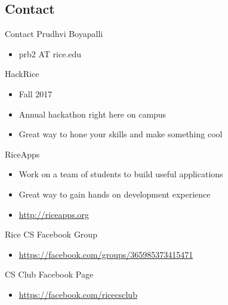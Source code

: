 \documentclass{beamer}
\begin{document}
\subsection{Contact}
	\begin{frame}[t]{Contact}
		Prudhvi Boyapalli
		\begin{itemize}
			\item{prb2 AT rice.edu}
		\end{itemize}
		\pause

		HackRice
		\begin{itemize}
			\item{Fall 2017}
			\item{Annual hackathon right here on campus}
			\item{Great way to hone your skills and make something cool}
		\end{itemize}
		\pause

		RiceApps
		\begin{itemize}
			\item{Work on a team of students to build useful applications}
			\item{Great way to gain hands on development experience}
			\item{\url{http://riceapps.org}}
		\end{itemize}
		\pause

		Rice CS Facebook Group
		\begin{itemize}
			\item{\url{https://facebook.com/groups/365985373415471}}
		\end{itemize}

		CS Club Facebook Page
		\begin{itemize}
			\item{\url{https://facebook.com/ricecsclub}}
		\end{itemize}
	\end{frame}
\end{document}
